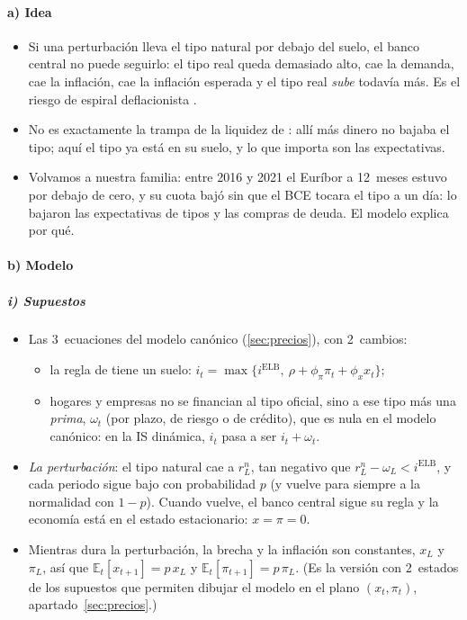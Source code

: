 \documentclass[11pt]{article}
\begin{document}
\paragraph{a) Idea}
\begin{itemize}
\item Si una perturbación lleva el tipo natural por debajo del suelo, el banco central no puede seguirlo: el tipo real queda demasiado alto, cae la demanda, cae la inflación, cae la inflación esperada y el tipo real \emph{sube} todavía más. Es el riesgo de espiral deflacionista\nocite{Krugman1998Baaack,EggertssonWoodford2003Zero} .
\item No es exactamente la trampa de la liquidez de  : allí más dinero no bajaba el tipo; aquí el tipo ya está en su suelo, y lo que importa son las expectativas.
\item Volvamos a nuestra familia: entre 2016 y 2021 el Euríbor a 12~meses estuvo por debajo de cero\nocite{BCE2026FMEuribor}, y su cuota bajó sin que el BCE tocara el tipo a un día: lo bajaron las expectativas de tipos y las compras de deuda. El modelo explica por qué.
\end{itemize}

\paragraph{b) Modelo}

\subparagraph{i) Supuestos}
\begin{itemize}
\item Las 3~ecuaciones del modelo canónico (\ref{sec:precios}), con 2~cambios\nocite{EggertssonWoodford2003Zero,Eggertsson2011Fiscal}:
  \begin{itemize}
  \item la regla de  tiene un suelo: $i_t=\max\big\{i^{\mathrm{ELB}},\ \rho+\phi_\pi\pi_t+\phi_x x_t\big\}$;
  \item hogares y empresas no se financian al tipo oficial, sino a ese tipo más una \emph{prima}, $\omega_t$ (por plazo, de riesgo o de crédito), que es nula en el modelo canónico\nocite{CurdiaWoodford2010Credit}: en la IS dinámica, $i_t$ pasa a ser $i_t+\omega_t$.
  \end{itemize}
\item \emph{La perturbación}: el tipo natural cae a $r^n_L$, tan negativo que $r^n_L-\omega_L<i^{\mathrm{ELB}}$, y cada periodo sigue bajo con probabilidad $p$ (y vuelve para siempre a la normalidad con $1-p$). Cuando vuelve, el banco central sigue su regla y la economía está en el estado estacionario: $x=\pi=0$.
\item Mientras dura la perturbación, la brecha y la inflación son constantes, $x_L$ y $\pi_L$, así que $\mathbb{E}_t[x_{t+1}]=p\,x_L$ y $\mathbb{E}_t[\pi_{t+1}]=p\,\pi_L$. (Es la versión con 2~estados de los supuestos que permiten dibujar el modelo en el plano $(x_t,\pi_t)$, apartado~\ref{sec:precios}.)
\end{itemize}
\end{document}
